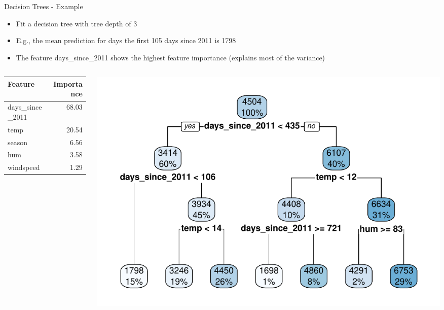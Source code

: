 \documentclass[11pt,compress,t,notes=noshow, aspectratio=169, xcolor=table]{beamer}
\begin{document}
\begin{frame}{Decision Trees - Example}
\begin{itemize}
    \item Fit a decision tree with tree depth of 3
    \item E.g., the mean prediction for days the first 105 days since 2011 is 1798
    \item The feature days\_since\_2011 shows the highest feature importance (explains most of the variance)
\end{itemize}
\begin{columns}[T]
\begin{column}{0.4\textwidth}
\begin{table}[ht]
\centering
\begin{tabular}{lr}
  \hline
Feature & Importance \\ 
  \hline
days\_since\_2011 & 68.03 \\ 
  temp & 20.54 \\ 
  season & 6.56 \\ 
  hum & 3.58 \\ 
  windspeed & 1.29 \\ 
   \hline
\end{tabular}
\end{table}
\end{column}
\begin{column}{0.6\textwidth}
  \includegraphics[width = \textwidth]{slides/interpretable-models/figure/tree.pdf} 
\end{column}
\end{columns}
 
\end{frame}
\end{document}
